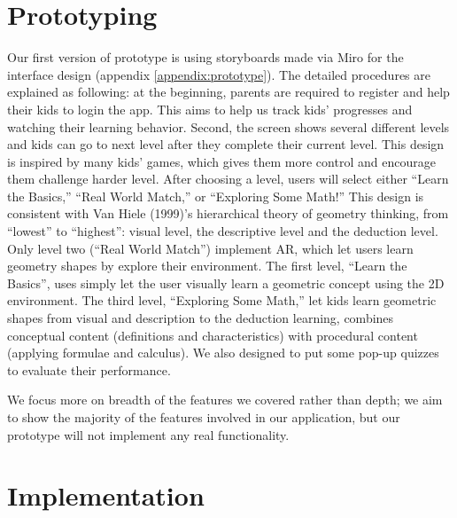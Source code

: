 \documentclass[acmsmall, nonacm]{acmart}
\begin{document}
\section{Prototyping}

Our first version of prototype is using storyboards made via Miro for the
interface design (appendix \ref{appendix:prototype}). The detailed procedures
are explained as following: at the beginning, parents are required to register
and help their kids to login the app. This aims to help us track kids’
progresses and watching their learning behavior. Second, the screen shows
several different levels and kids can go to next level after they complete their
current level. This design is inspired by many kids’ games, which gives them
more control and encourage them challenge harder level. After choosing a level,
users will select either ``Learn the Basics,'' ``Real World Match,'' or ``Exploring
Some Math!'' This design is consistent with Van Hiele (1999)’s hierarchical
theory of geometry thinking, from “lowest” to “highest”: visual level, the
descriptive level and the deduction level. Only level two (“Real World Match”)
implement AR, which let users learn geometry shapes by explore their
environment. The first level, “Learn the Basics”, uses simply let the user
visually learn a geometric concept using the 2D environment. The third level,
“Exploring Some Math,” let kids learn geometric shapes from visual and
description to the deduction learning, combines conceptual content (definitions
and characteristics) with procedural content (applying formulae and
calculus). We also designed to put some pop-up quizzes to evaluate their
performance.

We focus more on breadth of the features we covered rather than depth; we aim to
show the majority of the features involved in our application, but our prototype
will not implement any real functionality.


\section{Implementation}
\end{document}

